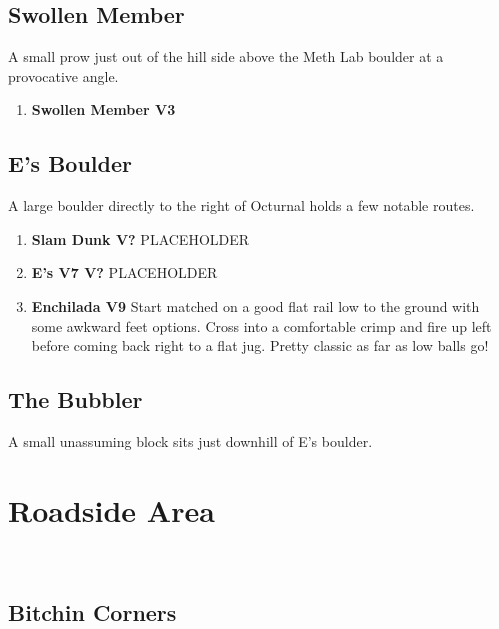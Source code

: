 \subsection*{Swollen Member}\label{bf:Swollen Member}
A small prow just out of the hill side above the Meth Lab boulder at a provocative angle.

\begin{enumerate}[resume]
	\item\label{rt:Swollen Member} \colorbox{green!20}{\textbf{Swollen Member V3  } }
	\newline \
\end{enumerate}
\subsection*{E's Boulder}\label{bf:E's Boulder}
A large boulder directly to the right of Octurnal holds a few notable routes.

\begin{enumerate}[resume]
	\item\label{rt:Slam Dunk} \colorbox{black!20}{\textbf{Slam Dunk V?  } }
	\newline PLACEHOLDER\
	\item\label{rt:E's V7} \colorbox{black!20}{\textbf{E's V7 V?  } }
	\newline PLACEHOLDER\
	\item\label{rt:Enchilada} \colorbox{Goldenrod!50}{\textbf{Enchilada V9     } }
	\newline Start matched on a good flat rail low to the ground with some awkward feet options. Cross into a comfortable crimp and fire up left before coming back right to a flat jug. Pretty classic as far as low balls go!\
\end{enumerate}
\subsection*{The Bubbler}\label{bf:The Bubbler}
A small unassuming block sits just downhill of E's boulder.

\section{Roadside Area}\label{sa:Roadside Area}
\

\subsection*{Bitchin Corners}\label{bf:Bitchin Corners}
\

